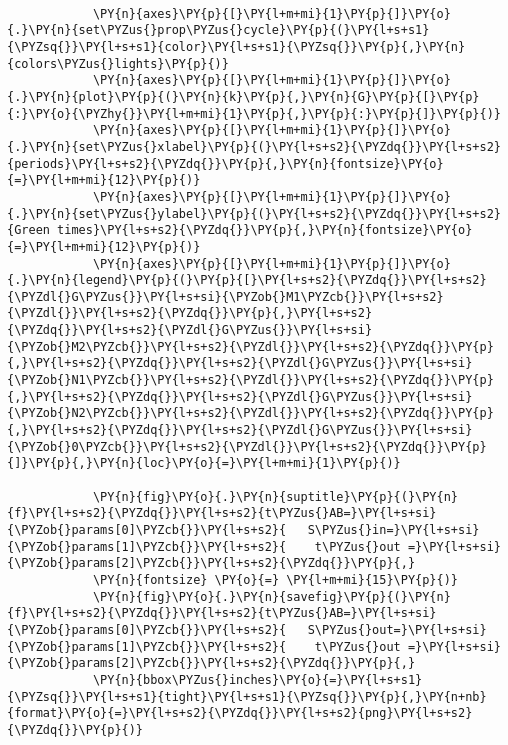 \begin{Verbatim}[commandchars=\\\{\}]
            
            \PY{n}{axes}\PY{p}{[}\PY{l+m+mi}{1}\PY{p}{]}\PY{o}{.}\PY{n}{set\PYZus{}prop\PYZus{}cycle}\PY{p}{(}\PY{l+s+s1}{\PYZsq{}}\PY{l+s+s1}{color}\PY{l+s+s1}{\PYZsq{}}\PY{p}{,}\PY{n}{colors\PYZus{}lights}\PY{p}{)}
            \PY{n}{axes}\PY{p}{[}\PY{l+m+mi}{1}\PY{p}{]}\PY{o}{.}\PY{n}{plot}\PY{p}{(}\PY{n}{k}\PY{p}{,}\PY{n}{G}\PY{p}{[}\PY{p}{:}\PY{o}{\PYZhy{}}\PY{l+m+mi}{1}\PY{p}{,}\PY{p}{:}\PY{p}{]}\PY{p}{)}
            \PY{n}{axes}\PY{p}{[}\PY{l+m+mi}{1}\PY{p}{]}\PY{o}{.}\PY{n}{set\PYZus{}xlabel}\PY{p}{(}\PY{l+s+s2}{\PYZdq{}}\PY{l+s+s2}{periods}\PY{l+s+s2}{\PYZdq{}}\PY{p}{,}\PY{n}{fontsize}\PY{o}{=}\PY{l+m+mi}{12}\PY{p}{)}
            \PY{n}{axes}\PY{p}{[}\PY{l+m+mi}{1}\PY{p}{]}\PY{o}{.}\PY{n}{set\PYZus{}ylabel}\PY{p}{(}\PY{l+s+s2}{\PYZdq{}}\PY{l+s+s2}{Green times}\PY{l+s+s2}{\PYZdq{}}\PY{p}{,}\PY{n}{fontsize}\PY{o}{=}\PY{l+m+mi}{12}\PY{p}{)}
            \PY{n}{axes}\PY{p}{[}\PY{l+m+mi}{1}\PY{p}{]}\PY{o}{.}\PY{n}{legend}\PY{p}{(}\PY{p}{[}\PY{l+s+s2}{\PYZdq{}}\PY{l+s+s2}{\PYZdl{}G\PYZus{}}\PY{l+s+si}{\PYZob{}M1\PYZcb{}}\PY{l+s+s2}{\PYZdl{}}\PY{l+s+s2}{\PYZdq{}}\PY{p}{,}\PY{l+s+s2}{\PYZdq{}}\PY{l+s+s2}{\PYZdl{}G\PYZus{}}\PY{l+s+si}{\PYZob{}M2\PYZcb{}}\PY{l+s+s2}{\PYZdl{}}\PY{l+s+s2}{\PYZdq{}}\PY{p}{,}\PY{l+s+s2}{\PYZdq{}}\PY{l+s+s2}{\PYZdl{}G\PYZus{}}\PY{l+s+si}{\PYZob{}N1\PYZcb{}}\PY{l+s+s2}{\PYZdl{}}\PY{l+s+s2}{\PYZdq{}}\PY{p}{,}\PY{l+s+s2}{\PYZdq{}}\PY{l+s+s2}{\PYZdl{}G\PYZus{}}\PY{l+s+si}{\PYZob{}N2\PYZcb{}}\PY{l+s+s2}{\PYZdl{}}\PY{l+s+s2}{\PYZdq{}}\PY{p}{,}\PY{l+s+s2}{\PYZdq{}}\PY{l+s+s2}{\PYZdl{}G\PYZus{}}\PY{l+s+si}{\PYZob{}0\PYZcb{}}\PY{l+s+s2}{\PYZdl{}}\PY{l+s+s2}{\PYZdq{}}\PY{p}{]}\PY{p}{,}\PY{n}{loc}\PY{o}{=}\PY{l+m+mi}{1}\PY{p}{)}
            
            \PY{n}{fig}\PY{o}{.}\PY{n}{suptitle}\PY{p}{(}\PY{n}{f}\PY{l+s+s2}{\PYZdq{}}\PY{l+s+s2}{t\PYZus{}AB=}\PY{l+s+si}{\PYZob{}params[0]\PYZcb{}}\PY{l+s+s2}{   S\PYZus{}in=}\PY{l+s+si}{\PYZob{}params[1]\PYZcb{}}\PY{l+s+s2}{    t\PYZus{}out =}\PY{l+s+si}{\PYZob{}params[2]\PYZcb{}}\PY{l+s+s2}{\PYZdq{}}\PY{p}{,}
            \PY{n}{fontsize} \PY{o}{=} \PY{l+m+mi}{15}\PY{p}{)}
            \PY{n}{fig}\PY{o}{.}\PY{n}{savefig}\PY{p}{(}\PY{n}{f}\PY{l+s+s2}{\PYZdq{}}\PY{l+s+s2}{t\PYZus{}AB=}\PY{l+s+si}{\PYZob{}params[0]\PYZcb{}}\PY{l+s+s2}{   S\PYZus{}out=}\PY{l+s+si}{\PYZob{}params[1]\PYZcb{}}\PY{l+s+s2}{    t\PYZus{}out =}\PY{l+s+si}{\PYZob{}params[2]\PYZcb{}}\PY{l+s+s2}{\PYZdq{}}\PY{p}{,}
            \PY{n}{bbox\PYZus{}inches}\PY{o}{=}\PY{l+s+s1}{\PYZsq{}}\PY{l+s+s1}{tight}\PY{l+s+s1}{\PYZsq{}}\PY{p}{,}\PY{n+nb}{format}\PY{o}{=}\PY{l+s+s2}{\PYZdq{}}\PY{l+s+s2}{png}\PY{l+s+s2}{\PYZdq{}}\PY{p}{)}
            

\end{Verbatim}
